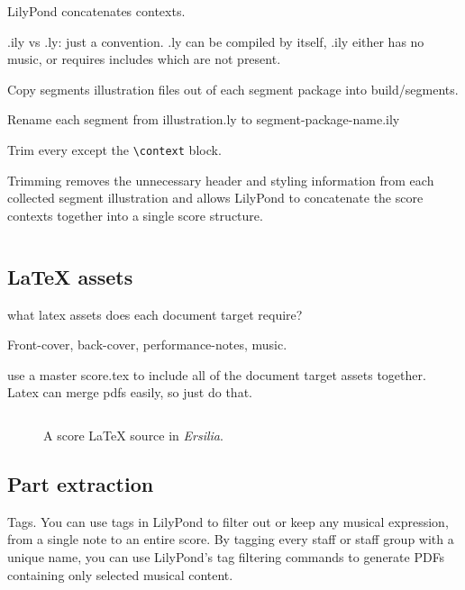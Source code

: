LilyPond concatenates contexts.

.ily vs .ly: just a convention. .ly can be compiled by itself, .ily either has
no music, or requires includes which are not present.

Copy segments illustration files out of each segment package into
build/segments.

Rename each segment from illustration.ly to segment-package-name.ily

Trim every except the \texttt{\textbackslash{}context} block.

Trimming removes the unnecessary header and styling information from each
collected segment illustration and allows LilyPond to concatenate the score
contexts together into a single score structure.

\begin{singlespacing}
\vspace{-0.5\baselineskip}
\inputminted{tex}{../../Documents/Scores/ersilia/ersilia/build/segments.ily}
\end{singlespacing}

\subsection{LaTeX assets}
\label{ssec:latex-assets}

what latex assets does each document target require?

Front-cover, back-cover, performance-notes, music.

use a master score.tex to include all of the document target assets together.
Latex can merge pdfs easily, so just do that.

\begin{figure}[h!]
\begin{singlespacing}
\vspace{-0.5\baselineskip}
\inputminted{tex}{../../Documents/Scores/ersilia/ersilia/build/11x17-portrait/ersilia-11x17-portrait-score.tex}
\end{singlespacing}
\vspace{-0.5\baselineskip}
\caption{A score LaTeX source in \emph{Ersilia}.}
\end{figure}

\subsection{Part extraction}
\label{ssec:part-extraction}

Tags. You can use tags in LilyPond to filter out or keep any musical
expression, from a single note to an entire score. By tagging every staff or
staff group with a unique name, you can use LilyPond's tag filtering commands
to generate PDFs containing only selected musical content.

